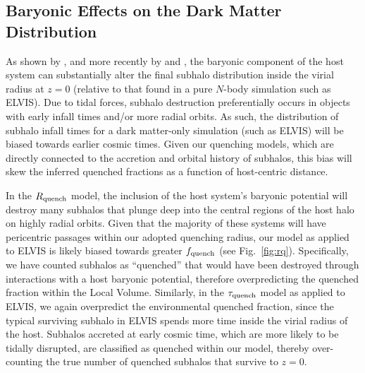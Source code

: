 



\subsection{Baryonic Effects on the Dark Matter Distribution}
\label{subsec:DES}

As shown by \citet{donghia10}, and more recently by \citet{gk17} and
\citet{sawala17}, the baryonic component of the host system can substantially
alter the final subhalo distribution inside the virial radius at $z=0$ (relative
to that found in a pure $N$-body simulation such as ELVIS).
%
Due to tidal forces, subhalo destruction preferentially occurs in objects with
early infall times and/or more radial orbits.
%
As such, the distribution of subhalo infall times for a dark matter-only
simulation (such as ELVIS) will be biased towards earlier cosmic times.
%
Given our quenching models, which are directly connected to the accretion
and orbital history of subhalos, this bias will skew the inferred quenched
fractions as a function of host-centric distance. 

%


In the $R_{\rm quench}$ model, the inclusion of the host system's baryonic
potential will destroy many subhalos that plunge deep into the central regions
of the host halo on highly radial orbits. Given that the majority of these
systems will have pericentric passages within our adopted quenching radius, our
model as applied to ELVIS is likely biased towards greater $f_{\rm quench}$ (see
Fig.~\ref{fig:rq}).
%
Specifically, we have counted subhalos as ``quenched'' that would have been
destroyed through interactions with a host baryonic potential, therefore
overpredicting the quenched fraction within the Local Volume.
%
Similarly, in the $\tau_{\rm quench}$ model as applied to ELVIS, we again
overpredict the environmental quenched fraction, since the typical surviving
subhalo in ELVIS spends more time inside the virial radius of the host. Subhalos
accreted at early cosmic time, which are more likely to be tidally disrupted,
are classified as quenched within our model, thereby over-counting the true
number of quenched subhalos that survive to $z=0$.
%



